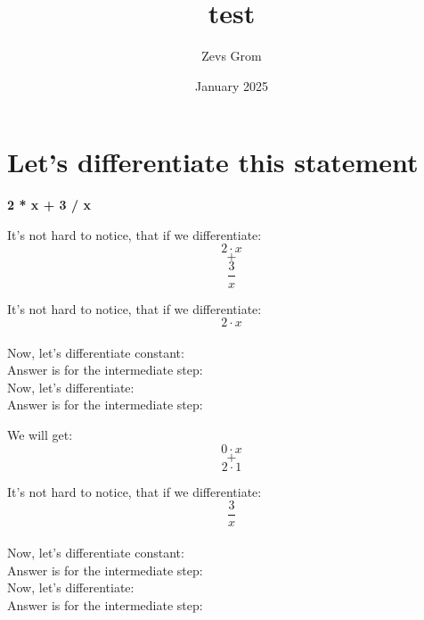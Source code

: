 \documentclass{article}
\title{test}
\author{Zevs Grom}
\date{January 2025}
\begin{document}
\maketitle
\section{Let's differentiate this statement} \textbf{\Large 2 * x + 3 / x\normalsize}

It's not hard to notice, that if we differentiate:\begin{equation}
 2 \cdot x 
 \end{equation}
\begin{equation}
+
 \end{equation}
\begin{equation}
\frac{ 3 }{ x}
 \end{equation}

It's not hard to notice, that if we differentiate:\begin{equation}
 2 \cdot x 
 \end{equation}
\\Now, let's differentiate constant:  \texbf{\large 2 \normalsize}
\\Answer is for the intermediate step:  \texbf{\large 0 \normalsize}
\\Now, let's differentiate:  
\\Answer is for the intermediate step:  \texbf{\large 1 \normalsize}

We will get:\begin{equation}
 0 \cdot x 
 \end{equation}
\begin{equation}
+
 \end{equation}
\begin{equation}
 2 \cdot 1 
 \end{equation}

It's not hard to notice, that if we differentiate:\begin{equation}
\frac{ 3 }{ x}
 \end{equation}
\\Now, let's differentiate constant:  \texbf{\large 3 \normalsize}
\\Answer is for the intermediate step:  \texbf{\large 0 \normalsize}
\\Now, let's differentiate:  
\\Answer is for the intermediate step:  \texbf{\large 1 \normalsize}
\end{document}
